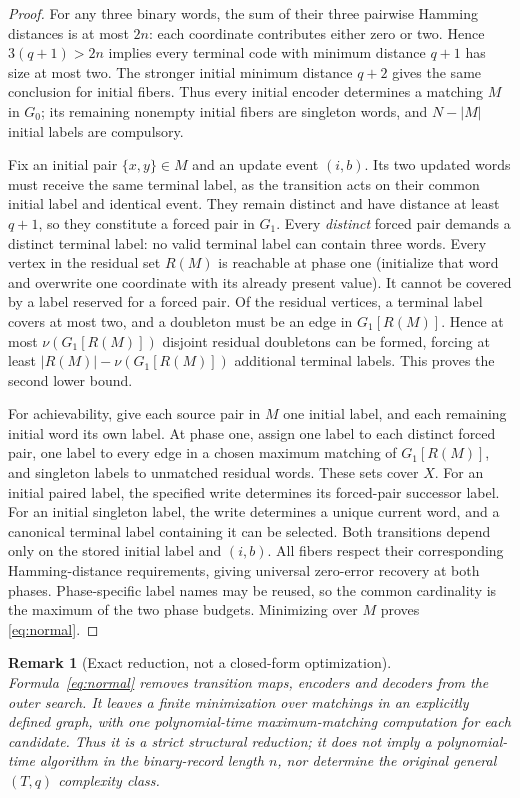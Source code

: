 \documentclass[11pt,a4paper]{article}
\newtheorem{remark}[theorem]{Remark}
\begin{document}
\begin{proof}
For any three binary words, the sum of their three pairwise Hamming distances is at most $2n$: each coordinate contributes either zero or two. Hence $3(q+1)>2n$ implies every terminal code with minimum distance $q+1$ has size at most two. The stronger initial minimum distance $q+2$ gives the same conclusion for initial fibers. Thus every initial encoder determines a matching $M$ in $G_0$; its remaining nonempty initial fibers are singleton words, and $N-|M|$ initial labels are compulsory.

Fix an initial pair $\{x,y\}\in M$ and an update event $(i,b)$. Its two updated words must receive the same terminal label, as the transition acts on their common initial label and identical event. They remain distinct and have distance at least $q+1$, so they constitute a forced pair in $G_1$. Every \emph{distinct} forced pair demands a distinct terminal label: no valid terminal label can contain three words. Every vertex in the residual set $R(M)$ is reachable at phase one (initialize that word and overwrite one coordinate with its already present value). It cannot be covered by a label reserved for a forced pair. Of the residual vertices, a terminal label covers at most two, and a doubleton must be an edge in $G_1[R(M)]$. Hence at most $\nu(G_1[R(M)])$ disjoint residual doubletons can be formed, forcing at least $|R(M)|-\nu(G_1[R(M)])$ additional terminal labels. This proves the second lower bound.

For achievability, give each source pair in $M$ one initial label, and each remaining initial word its own label. At phase one, assign one label to each distinct forced pair, one label to every edge in a chosen maximum matching of $G_1[R(M)]$, and singleton labels to unmatched residual words. These sets cover $X$. For an initial paired label, the specified write determines its forced-pair successor label. For an initial singleton label, the write determines a unique current word, and a canonical terminal label containing it can be selected. Both transitions depend only on the stored initial label and $(i,b)$. All fibers respect their corresponding Hamming-distance requirements, giving universal zero-error recovery at both phases. Phase-specific label names may be reused, so the common cardinality is the maximum of the two phase budgets. Minimizing over $M$ proves \eqref{eq:normal}.
\end{proof}

\begin{remark}[Exact reduction, not a closed-form optimization]
Formula~\eqref{eq:normal} removes transition maps, encoders and decoders from the outer search. It leaves a finite minimization over matchings in an explicitly defined graph, with one polynomial-time maximum-matching computation for each candidate. Thus it is a strict structural reduction; it does not imply a polynomial-time algorithm in the binary-record length $n$, nor determine the original general $(T,q)$ complexity class.
\end{remark}
\end{document}
